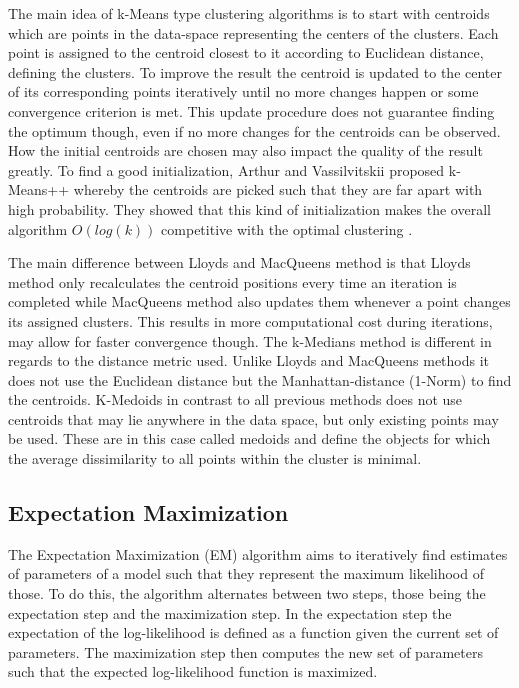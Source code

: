 \documentclass[
	a4paper,
	english,
	twoside,
	openright,               
	11pt                            
	]{report}
\begin{document}
The main idea of k-Means type clustering algorithms is to start with centroids which are points in the data-space representing the centers of the clusters. Each point is assigned to the centroid closest to it according to Euclidean distance, defining the clusters. To improve the result the centroid is updated to the center of its corresponding points iteratively until no more changes happen or some convergence criterion is met. This update procedure does not guarantee finding the optimum though, even if no more changes for the centroids can be observed. How the initial centroids are chosen may also impact the quality of the result greatly. To find a good initialization, Arthur and Vassilvitskii \cite{10.5555/1283383.1283494} proposed k-Means++ whereby the centroids are picked such that they are far apart with high probability. They showed that this kind of initialization makes the overall algorithm $O(log(k))$ competitive with the optimal clustering \cite{10.5555/1283383.1283494}.

The main difference between Lloyds and MacQueens method is that Lloyds method only recalculates the centroid positions every time an iteration is completed while MacQueens method also updates them whenever a point changes its assigned clusters. This results in more computational cost during iterations, may allow for faster convergence though. The k-Medians method is different in regards to the distance metric used. Unlike Lloyds and MacQueens methods it does not use the Euclidean distance but the Manhattan-distance (1-Norm) to find the centroids. K-Medoids in contrast to all previous methods does not use centroids that may lie anywhere in the data space, but only existing points may be used. These are in this case called medoids and define the objects for which the average dissimilarity to all points within the cluster is minimal.

\subsection{Expectation Maximization}
The Expectation Maximization (EM) algorithm \cite{10.2307/2984875} aims to iteratively find estimates of parameters of a model such that they represent the maximum likelihood of those. To do this, the algorithm alternates between two steps, those being the expectation step and the maximization step. In the expectation step the expectation of the log-likelihood is defined as a function given the current set of parameters. The maximization step then computes the new set of parameters such that the expected log-likelihood function is maximized.
\end{document}
